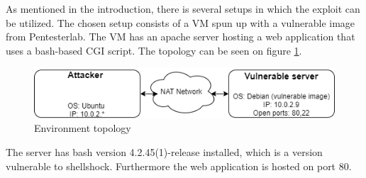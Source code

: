 
As mentioned in the introduction, there is several setups in which the exploit can be utilized. The chosen setup consists of a VM spun up with a vulnerable image from Pentesterlab\cite{pentesterlab}. The VM has an apache server hosting a web application that uses a bash-based CGI script. The topology can be seen on figure \ref{fig:network-topology}. 
\begin{figure} [ht]
    \centering
    \includegraphics[width=\columnwidth]{drawio/topology.png}
    \caption{Environment topology}
    \label{fig:network-topology}
\end{figure} 

The server has bash version 4.2.45(1)-release installed, which is a version vulnerable to shellshock. Furthermore the web application is hosted on port 80. 




 